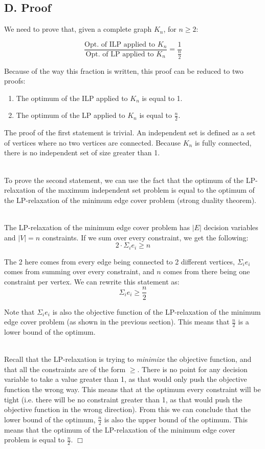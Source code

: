 \documentclass[12pt]{article}
\begin{document}
\subsection{D. Proof}
We need to prove that, given a complete graph $K_n$, for $n \geq 2$:

\[ \frac{\text{Opt. of ILP applied to } K_n}{\text{Opt. of LP applied to } K_n} = \frac{1}{\frac{n}{2}} \]

\noindent
Because of the way this fraction is written, this proof can be reduced to two proofs:

\begin{enumerate}
  \item The optimum of the ILP applied to $K_n$ is equal to 1.
  \item The optimum of the LP applied to $K_n$ is equal to $\frac{n}{2}$.
\end{enumerate}

\noindent
The proof of the first statement is trivial.
An independent set is defined as a set of vertices where no two vertices are connected.
Because $K_n$ is fully connected, there is no independent set of size greater than 1.

\noindent
\\
To prove the second statement, we can use the fact that the optimum of the LP-relaxation of the maximum independent set problem is equal to the optimum of the LP-relaxation of the minimum edge cover problem (strong duality theorem).

\newpage
\noindent
\\
The LP-relaxation of the minimum edge cover problem has $|E|$ decision variables and $|V| = n$ constraints.
If we sum over every constraint, we get the following:
\[ 2 \cdot \Sigma_i e_i \geq n \]

\noindent
The 2 here comes from every edge being connected to 2 different vertices, $\Sigma_i e_i$ comes from summing over every constraint, and $n$ comes from there being one constraint per vertex.
We can rewrite this statement as:
\[ \Sigma_i e_i \geq \frac{n}{2} \]

\noindent
Note that $\Sigma_i e_i$ is also the objective function of the LP-relaxation of the minimum edge cover problem (as shown in the previous section).
This means that $\frac{n}{2}$ is a lower bound of the optimum.

\noindent
\\
Recall that the LP-relaxation is trying to \textit{minimize} the objective function, and that all the constraints are of the form $\geq$.
There is no point for any decision variable to take a value greater than 1, as that would only push the objective function the wrong way.
This means that at the optimum every constraint will be tight (i.e. there will be no constraint greater than 1, as that would push the objective function in the wrong direction).
From this we can conclude that the lower bound of the optimum, $\frac{n}{2}$ is also the upper bound of the optimum.
This means that the optimum of the LP-relaxation of the minimum edge cover problem is equal to $\frac{n}{2}$. $\Box$
\end{document}
